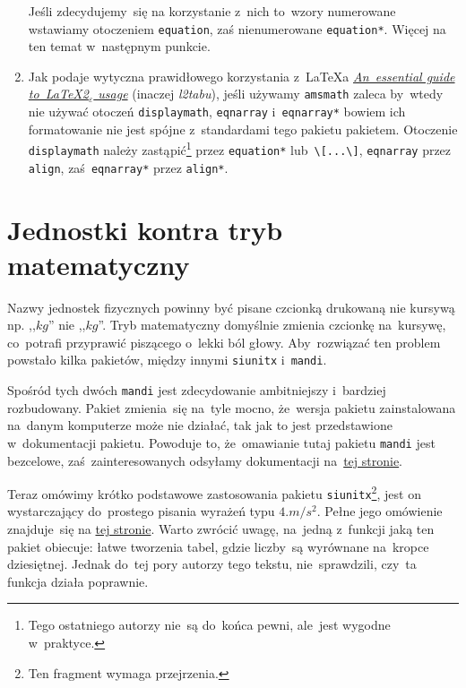 \documentclass[a4paper,11pt]{article}
\newcommand{\tbs}{\textbackslash}  %
\begin{document}
\begin{enumerate}
  Jeśli zdecydujemy~się na korzystanie z~nich to~wzory numerowane
  wstawiamy otoczeniem \texttt{equation}, zaś nienumerowane
  \texttt{equation*}. Więcej na ten temat w~następnym punkcie.

\item Jak podaje wytyczna prawidłowego korzystania z~\LaTeX a
  \href{ftp://ftp.gust.org.pl/TeX/info/l2tabu/english/l2tabuen.pdf}{\emph{An~essential
      guide to~\LaTeX 2$_{ \varepsilon}$ usage}} (inaczej
  \emph{l2tabu}), jeśli używamy \texttt{amsmath} zaleca by~wtedy nie
  używać otoczeń \texttt{displaymath}, \texttt{eqnarray}
  i~\texttt{eqnarray*} bowiem ich formatowanie nie jest spójne
  z~standardami tego pakietu pakietem. Otoczenie \texttt{displaymath}
  należy zastąpić\footnote{Tego ostatniego autorzy nie~są do~końca
    pewni, ale~jest wygodne w~praktyce.} przez \texttt{equation*}
  lub~\texttt{\tbs [...\tbs ]}, \texttt{eqnarray} przez
  \texttt{align}, zaś~\texttt{eqnarray*} przez \texttt{align*}.
  
\end{enumerate}





\section{Jednostki kontra tryb matematyczny}
\label{sec:jednostki}

Nazwy jednostek fizycznych powinny być pisane czcionką drukowaną nie
kursywą np. ,,$\si{kg}$'' nie ,,$kg$''. Tryb matematyczny domyślnie
zmienia czcionkę na~kursywę, co~potrafi przyprawić piszącego o~lekki
ból głowy. Aby~rozwiązać ten problem powstało kilka pakietów, między
innymi \texttt{siunitx} i~\texttt{mandi}.

Spośród tych dwóch \texttt{mandi} jest zdecydowanie ambitniejszy
i~bardziej rozbudowany. Pakiet zmienia~się na~tyle mocno, że~wersja
pakietu zainstalowana na~danym komputerze może nie działać, tak jak to
jest przedstawione w~dokumentacji pakietu. Powoduje to, że~omawianie
tutaj pakietu \texttt{mandi} jest bezcelowe, zaś~zainteresowanych
odsyłamy dokumentacji
na~\href{ftp://ftp.gust.org.pl/TeX/macros/latex/contrib/mandi/mandi.pdf}{tej
  stronie}.

Teraz omówimy krótko podstawowe zastosowania pakietu
\texttt{siunitx}\footnote{Ten fragment wymaga przejrzenia.}, jest on
wystarczający do~prostego pisania wyrażeń typu $4\si{.m/s^{ 2 }}$.
Pełne jego omówienie znajduje~się na
\href{ftp://ftp.gust.org.pl/TeX/macros/latex/contrib/siunitx/siunitx.pdf}{tej
  stronie}. Warto zwrócić uwagę, na~jedną z~funkcji jaką ten pakiet
obiecuje: łatwe tworzenia tabel, gdzie liczby~są wyrównane na~kropce
dziesiętnej. Jednak do~tej pory autorzy tego tekstu, nie~sprawdzili,
czy~ta funkcja działa poprawnie.
\end{document}
